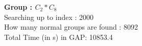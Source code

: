 \textbf{Group : $C_2*C_8$}\\
Searching up to index : 2000\\
How many normal groups are found : 8092\\
Total Time (in s) in GAP: 10853.4\\
